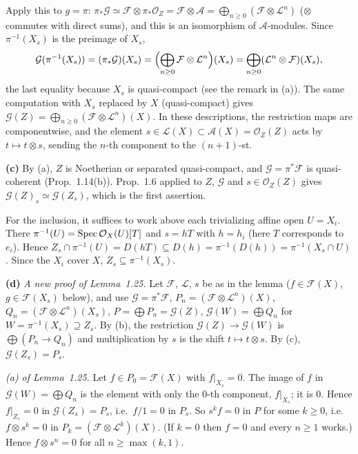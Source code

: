 \documentclass[11pt]{article}
\begin{document}
Apply this to $g=\pi$: $\pi_*\mathcal G\simeq\mathcal F\otimes\pi_*\mathcal O_Z=\mathcal F\otimes\mathcal A=\bigoplus_{n\ge0}(\mathcal F\otimes\mathcal L^n)$ ($\otimes$ commutes with direct sums), and this is an isomorphism of $\mathcal A$-modules. Since $\pi^{-1}(X_s)$ is the preimage of $X_s$,
\[ \mathcal G(\pi^{-1}(X_s))=(\pi_*\mathcal G)(X_s)=\Bigl(\bigoplus_{n\ge0}\mathcal F\otimes\mathcal L^n\Bigr)(X_s)=\bigoplus_{n\ge0}(\mathcal L^n\otimes\mathcal F)(X_s), \]
the last equality because $X_s$ is quasi-compact (see the remark in (a)). The same computation with $X_s$ replaced by $X$ (quasi-compact) gives $\mathcal G(Z)=\bigoplus_{n\ge0}(\mathcal F\otimes\mathcal L^n)(X)$. In these descriptions, the restriction maps are componentwise, and the element $s\in\mathcal L(X)\subset\mathcal A(X)=\mathcal O_Z(Z)$ acts by $t\mapsto t\otimes s$, sending the $n$-th component to the $(n+1)$-st.

\textbf{(c)} By (a), $Z$ is Noetherian or separated quasi-compact, and $\mathcal G=\pi^*\mathcal F$ is quasi-coherent (Prop.~1.14(b)). Prop.~1.6 applied to $Z$, $\mathcal G$ and $s\in\mathcal O_Z(Z)$ gives $\mathcal G(Z)_s\simeq\mathcal G(Z_s)$, which is the first assertion.

For the inclusion, it suffices to work above each trivializing affine open $U=X_i$. There $\pi^{-1}(U)=\operatorname{Spec}\mathcal O_X(U)[T]$ and $s=hT$ with $h=h_i$ (here $T$ corresponds to $e_i$). Hence $Z_s\cap\pi^{-1}(U)=D(hT)\subseteq D(h)=\pi^{-1}(D(h))=\pi^{-1}(X_s\cap U)$. Since the $X_i$ cover $X$, $Z_s\subseteq\pi^{-1}(X_s)$.

\textbf{(d)} \emph{A new proof of Lemma~1.25.} Let $\mathcal F$, $\mathcal L$, $s$ be as in the lemma ($f\in\mathcal F(X)$, $g\in\mathcal F(X_s)$ below), and use $\mathcal G=\pi^*\mathcal F$, $P_n=(\mathcal F\otimes\mathcal L^n)(X)$, $Q_n=(\mathcal F\otimes\mathcal L^n)(X_s)$, $P=\bigoplus P_n=\mathcal G(Z)$, $\mathcal G(W)=\bigoplus Q_n$ for $W=\pi^{-1}(X_s)\supseteq Z_s$. By (b), the restriction $\mathcal G(Z)\to\mathcal G(W)$ is $\bigoplus(P_n\to Q_n)$ and multiplication by $s$ is the shift $t\mapsto t\otimes s$. By (c), $\mathcal G(Z_s)=P_s$.

\emph{(a) of Lemma~1.25.} Let $f\in P_0=\mathcal F(X)$ with $f|_{X_s}=0$. The image of $f$ in $\mathcal G(W)=\bigoplus Q_n$ is the element with only the $0$-th component, $f|_{X_s}$; it is $0$. Hence $f|_{Z_s}=0$ in $\mathcal G(Z_s)=P_s$, i.e.\ $f/1=0$ in $P_s$. So $s^kf=0$ in $P$ for some $k\ge0$, i.e.\ $f\otimes s^k=0$ in $P_k=(\mathcal F\otimes\mathcal L^k)(X)$. (If $k=0$ then $f=0$ and every $n\ge1$ works.) Hence $f\otimes s^n=0$ for all $n\ge\max(k,1)$.
\end{document}
